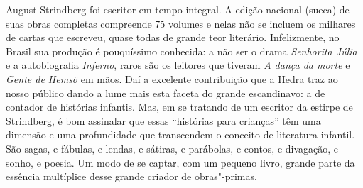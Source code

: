 August Strindberg foi escritor em tempo integral. A edição nacional
(sueca) de suas obras completas compreende 75 volumes e nelas não se
incluem os milhares de cartas que escreveu, quase todas de grande teor
literário. Infelizmente, no Brasil sua produção é pouquíssimo
conhecida: a não ser o drama \textit{Senhorita Júlia} e a autobiografia
\textit{Inferno}, raros são os leitores que tiveram \textit{A dança da
morte} e \textit{Gente de Hemsö} em mãos. Daí a excelente
contribuição que a Hedra traz ao nosso público dando a lume mais esta
faceta do grande escandinavo: a de contador de histórias infantis. Mas,
em se tratando de um escritor da estirpe de Strindberg, é bom assinalar
que essas ``histórias para crianças'' têm uma dimensão e uma profundidade
que transcendem o conceito de literatura infantil. São sagas, e
fábulas, e lendas, e sátiras, e parábolas, e contos, e divagação, e
sonho, e poesia. Um modo de se captar, com um pequeno livro, grande
parte da essência multíplice desse grande criador de obras"-primas.

